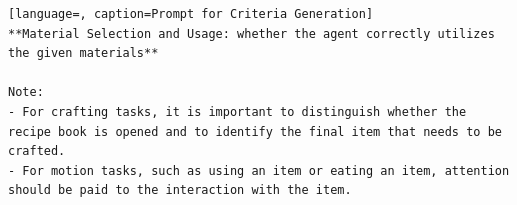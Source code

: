 \begin{lstlisting}[language=, caption=Prompt for Criteria Generation]
**Material Selection and Usage: whether the agent correctly utilizes the given materials**  

Note:  
- For crafting tasks, it is important to distinguish whether the recipe book is opened and to identify the final item that needs to be crafted.  
- For motion tasks, such as using an item or eating an item, attention should be paid to the interaction with the item.
\end{lstlisting}
































